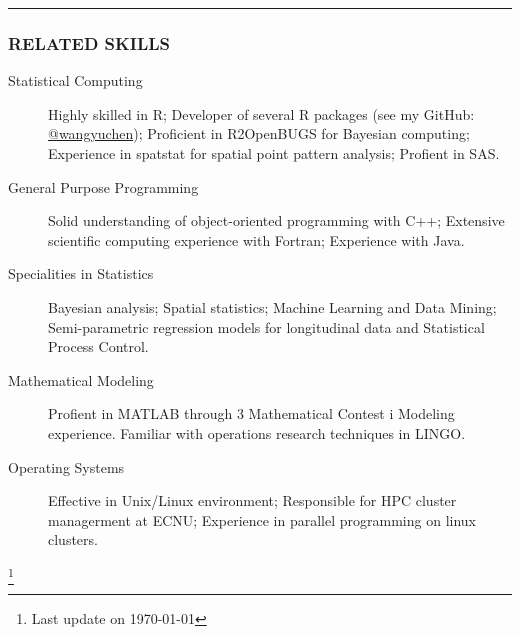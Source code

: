 \documentclass[11pt]{article}
\begin{document}
\vspace{0.2em}
\hrule

\subsubsection*{\centering RELATED SKILLS}
\vspace{-.4em}

\begin{description}
	\item[Statistical Computing] Highly skilled in R; Developer of several R packages (see my GitHub: \href{https://www.github.com/wangyuchen}{@wangyuchen}); Proficient in R2OpenBUGS for Bayesian computing; Experience in spatstat for spatial point pattern analysis; Profient in SAS.
	\item[General Purpose Programming] Solid understanding of object-oriented programming with C++; Extensive scientific computing experience with Fortran; Experience with Java.
	\item[Specialities in Statistics] Bayesian analysis; Spatial statistics; Machine Learning and Data Mining; Semi-parametric regression models for longitudinal data and Statistical Process Control.
	\item[Mathematical Modeling] Profient in MATLAB through 3 Mathematical Contest i Modeling experience. Familiar with operations research techniques in LINGO.
	\item[Operating Systems] Effective in Unix/Linux environment; Responsible for HPC cluster managerment at ECNU; Experience in parallel programming on linux clusters.
\end{description}

\let\thefootnote\relax\footnote{Last update on \today}
\end{document}
